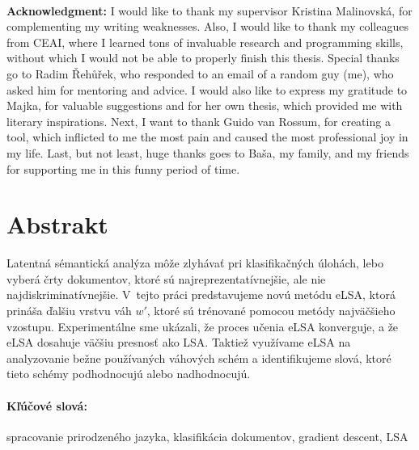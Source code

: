 \documentclass[12pt, oneside]{book}
\theoremstyle{definition}
\begin{document}
\newpage 
\thispagestyle{empty}



\frontmatter

\setcounter{page}{3}
\newpage 
~

\vfill
{\bf Acknowledgment:} 
I would like to thank my supervisor Kristina Malinovská, for complementing my writing weaknesses. 
Also, I would like to thank my colleagues from CEAI, where I learned tons of invaluable research and programming skills, without which I would not be able to properly finish this thesis.
Special thanks go to Radim Řehůřek, who responded to an email of a random guy (me), who asked him for mentoring and advice.
I would also like to express my gratitude to Majka, for valuable suggestions and for her own thesis, which provided me with literary inspirations.
Next, I want to thank Guido van Rossum, for creating a tool, which inflicted to me the most pain and caused the most professional joy in my life. 
Last, but not least, huge thanks goes to Baša, my family, and my friends for supporting me in this funny period of time. 




\newpage 
\section*{Abstrakt}

Latentná sémantická analýza môže zlyhávať pri klasifikačných úlohách, lebo vyberá črty dokumentov, ktoré sú najreprezentatívnejšie, ale nie najdiskriminatívnejšie. 
V~tejto práci predstavujeme novú metódu eLSA, ktorá prináša ďalšiu vrstvu váh $w'$, ktoré sú trénované pomocou metódy najväčšieho vzostupu.
Experimentálne sme ukázali, že proces učenia eLSA konverguje, a že eLSA dosahuje väčšiu presnosť ako LSA.
Taktiež využívame eLSA na analyzovanie bežne používaných váhových schém a identifikujeme slová, ktoré tieto schémy podhodnocujú alebo nadhodnocujú.

\paragraph*{Kľúčové slová:} spracovanie prirodzeného jazyka, klasifikácia dokumentov, gradient descent, LSA


\newpage 
\end{document}
